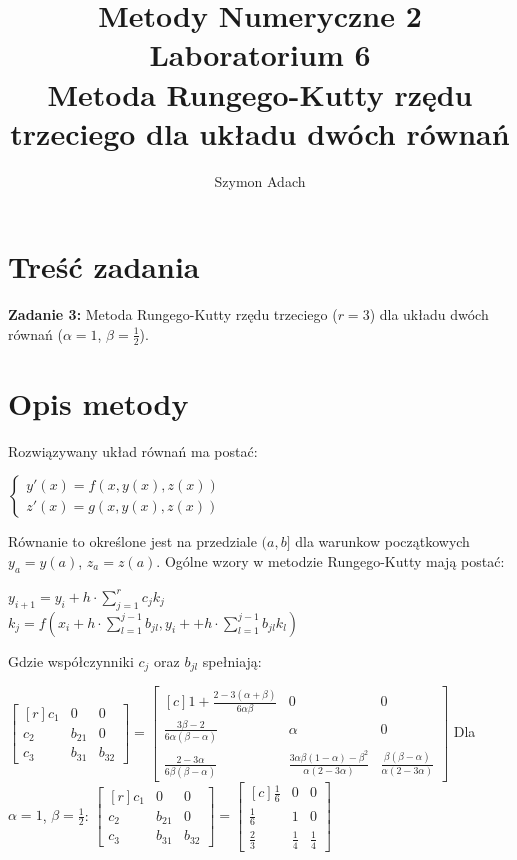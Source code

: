 \documentclass[]{article}
\title{\textbf{ Metody Numeryczne 2\\Laboratorium 6}\\
Metoda Rungego-Kutty rzędu trzeciego dla układu dwóch równań}
\author{Szymon Adach}
\begin{document}
\maketitle

\section{Treść zadania}
 \textbf{Zadanie 3:} Metoda Rungego-Kutty rzędu trzeciego ($r=3$) dla układu dwóch równań ($\alpha = 1$, $\beta = \frac{1}{2}$).
\section{Opis metody}
Rozwiązywany układ równań ma postać:
\begin{center}
	$\begin{cases} 
	y'(x) = f(x,y(x),z(x))\\
	z'(x) = g(x,y(x),z(x))
	\end{cases}$
\end{center}
Równanie to określone jest na przedziale $(a, b]$ dla warunkow początkowych $y_a=y(a)$, $z_a=z(a)$.
Ogólne wzory w metodzie Rungego-Kutty mają postać:
\begin{center}
	$y_{i+1}=y_i+h\cdot \sum\limits_{j=1}^{r}c_jk_j$\\
	$k_j=f(x_i+h\cdot \sum\limits_{l=1}^{j-1}b_{jl}, y_i + +h\cdot \sum_{l=1}^{j-1}b_{jl}k_l)$
\end{center}
Gdzie współczynniki $c_j$ oraz $b_{jl}$ spełniają:\\
\begin{center}
$\begin{bmatrix*}[r]
c_1 & 0 & 0\\
c_2 & b_{21} & 0\\
c_3 & b_{31} & b_{32}
\end{bmatrix*} = \begin{bmatrix*}[c]
1+\frac{2-3(\alpha+\beta)}{6\alpha\beta} & 0 & 0\\
\frac{3\beta-2}{6\alpha(\beta-\alpha)} & \alpha & 0\\
\frac{2-3\alpha}{6\beta(\beta-\alpha)} & \frac{3\alpha\beta(1-\alpha)-\beta^2}{\alpha(2-3\alpha)} & \frac{\beta(\beta-\alpha)}{\alpha(2-3\alpha)}\end{bmatrix*}
$
\newpage Dla $\alpha = 1$, $\beta = \frac{1}{2}$:
$\begin{bmatrix*}[r]
c_1 & 0 & 0\\
c_2 & b_{21} & 0\\
c_3 & b_{31} & b_{32}
\end{bmatrix*} = \begin{bmatrix*}[c]
\frac{1}{6} & 0 & 0\\
\frac{1}{6} &1 & 0\\
\frac{2}{3} & \frac{1}{4} & \frac{1}{4}
\end{bmatrix*} $
\end{center}
\end{document}
